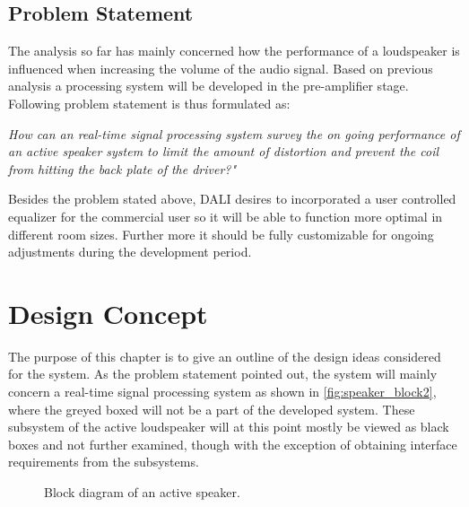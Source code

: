 %

%

%

\section{Problem Statement} \label{sec:problem_statement}
The analysis so far has mainly concerned how the performance of a loudspeaker is influenced when increasing the volume of the audio signal. Based on previous analysis a processing system will be developed in the pre-amplifier stage. Following problem statement is thus formulated as:

\begin{center}
\label{ProblemStatement}
\textit{How can an real-time signal processing system survey the on going performance of an active speaker system to limit the amount of distortion and prevent the coil from hitting the back plate of the driver?"}
\end{center}
Besides the problem stated above, DALI desires to incorporated a user controlled equalizer for the commercial user so it will be able to function more optimal in different room sizes. Further more it should be fully customizable for ongoing adjustments during the development period.


\chapter{Design Concept}
The purpose of this chapter is to give an outline of the design ideas considered for the system. As the problem statement pointed out, the system will mainly concern a real-time signal processing system as shown in \autoref{fig:speaker_block2}, where the greyed boxed will not be a part of the developed system. These subsystem of the active loudspeaker will at this point mostly be viewed as black boxes and not further examined, though with the exception of obtaining interface requirements from the subsystems.

\begin{figure}[H]
\centering
{}
\scalebox{0.9}{
}
\caption{Block diagram of an active speaker.}
\label{fig:speaker_block2}
\end{figure}

